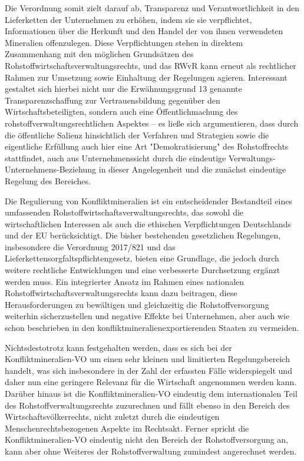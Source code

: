 \documentclass[12pt,a4paper,oneside]{book} %
\begin{document}
Die Verordnung somit zielt darauf ab, Transparenz und Verantwortlichkeit in den Lieferketten der Unternehmen zu erhöhen, indem sie sie verpflichtet, Informationen über die Herkunft und den Handel der von ihnen verwendeten Mineralien offenzulegen. Diese Verpflichtungen stehen in direktem Zusammenhang mit den möglichen Grundsätzen des Rohstoffwirtschaftsverwaltungsrechts, und das RWvR kann erneut als rechtlicher Rahmen zur Umsetzung sowie Einhaltung der Regelungen agieren. Interessant gestaltet sich hierbei nicht nur die Erwähnungsgrund 13 genannte Transparenzschaffung zur Vertrauensbildung gegenüber den Wirtschaftsbeteiligten, sondern auch eine Öffentlichmachung des rohstoffverwaltungsrechtlichen Aspektes -- es ließe sich argumentieren, dass durch die öffentliche Salienz hinsichtlich der Verfahren und Strategien sowie die eigentliche Erfüllung auch hier eine Art "Demokratisierung" des Rohstoffrechts stattfindet, auch aus Unternehmenssicht durch die eindeutige Verwaltungs-Unternehmens-Beziehung in dieser Angelegenheit und die zunächst eindeutige Regelung des Bereiches.

Die Regulierung von Konfliktmineralien ist ein entscheidender Bestandteil eines umfassenden Rohstoffwirtschaftsverwaltungsrechts, das sowohl die wirtschaftlichen Interessen als auch die ethischen Verpflichtungen Deutschlands und der EU berücksichtigt. Die bisher bestehenden gesetzlichen Regelungen, insbesondere die Verordnung  2017/821 und das Lieferkettensorgfaltspflichtengesetz, bieten eine Grundlage, die jedoch durch weitere rechtliche Entwicklungen und eine verbesserte Durchsetzung ergänzt werden muss. Ein integrierter Ansatz im Rahmen eines nationalen Rohstoffwirtschaftsverwaltungsrechts kann dazu beitragen, diese Herausforderungen zu bewältigen und gleichzeitig die Rohstoffversorgung weiterhin sicherzustellen und negative Effekte bei Unternehmen, aber auch wie schon beschrieben in den konfliktmineralienexportierenden Staaten zu vermeiden.

Nichtsdestotrotz kann festgehalten werden, dass es sich bei der Konfliktmineralien-VO um einen sehr kleinen und limitierten Regelungsbereich handelt, was sich insbesondere in der Zahl der erfassten Fälle widerspiegelt und daher nun eine geringere Relevanz für die Wirtschaft angenommen werden kann. Darüber hinaus ist die Konfliktmineralien-VO eindeutig dem internationalen Teil des Rohstoffverwaltungsrechts zuzurechnen und fällt ebenso in den Bereich des Wirtschaftsvölkerrechts, nicht zuletzt durch die eindeutigen Menschenrechtsbezogenen Aspekte im Rechtsakt. Ferner spricht die Konfliktmineralien-VO eindeutig nicht den Bereich der Rohstoffversorgung an, kann aber ohne Weiteres der Rohstoffverwaltung zumindest angerechnet werden.
\end{document}

